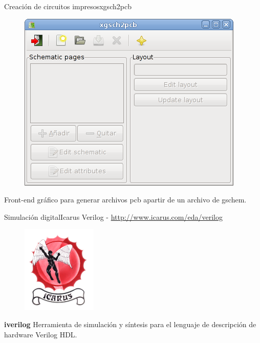 \documentclass{beamer}
\begin{document}
\begin{frame}{Creación de circuitos impresos}{xgsch2pcb}
  \begin{figure}[!h]
    \centering
    \includegraphics[scale=0.35]{img/xgsch2pcb.png}
  \end{figure}
  Front-end gráfico para generar archivos pcb apartir de un archivo de gschem.
\end{frame}



\begin{frame}{Simulación digital}{Icarus Verilog - \url{http://www.icarus.com/eda/verilog}}
  \begin{figure}[!h]
    \centering
    \includegraphics[scale=0.6]{img/icarus.png}
  \end{figure}
  \textbf{iverilog} Herramienta de simulación y síntesis para el lenguaje de descripción de hardware Verilog HDL.
\end{frame}
\end{document}
